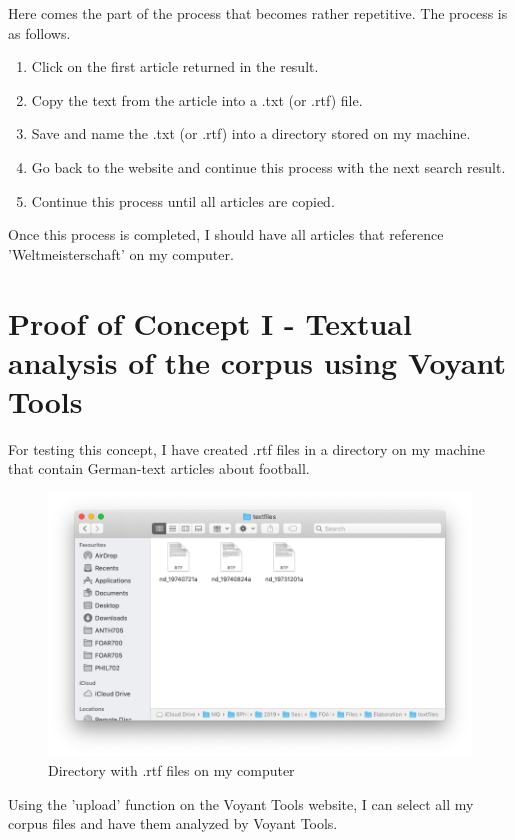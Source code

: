\documentclass{article}
\begin{document}
Here comes the part of the process that becomes rather repetitive. The process is as follows.

\begin{enumerate}
    \item Click on the first article returned in the result.
    \item Copy the text from the article into a .txt (or .rtf) file.
    \item Save and name the .txt (or .rtf) into a directory stored on my machine.
    \item Go back to the website and continue this process with the next search result.
    \item Continue this process until all articles are copied.
\end{enumerate}

Once this process is completed, I should have all articles that reference 'Weltmeisterschaft' on my computer.

\section*{Proof of Concept I - Textual analysis of the corpus using Voyant Tools}

For testing this concept, I have created .rtf files in a directory on my machine that contain German-text articles about football.

\begin{figure}[h!]
    \centering
    \includegraphics[width=\textwidth]{textfiles.png}
    \caption{Directory with .rtf files on my computer}
    \label{fig:my_label}
\end{figure}

Using the 'upload' function on the Voyant Tools website, I can select all my corpus files and have them analyzed by Voyant Tools.
\end{document}
